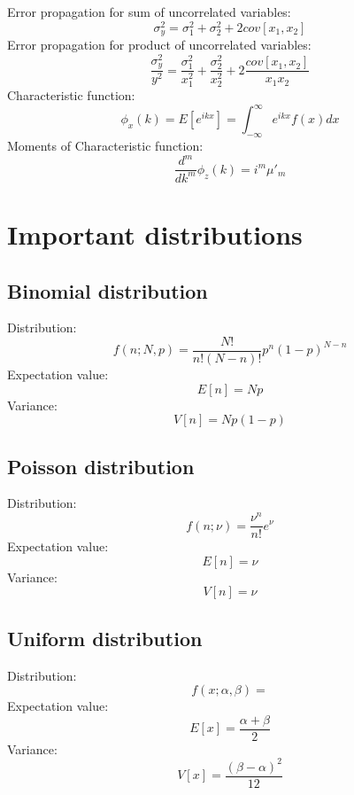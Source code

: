 \documentclass[12pt]{book}
\begin{document}
Error propagation for sum of uncorrelated variables:
\begin{equation}
	\sigma^2_y = \sigma^2_1 + \sigma^2_2 +2cov[x_1,x_2]
\end{equation}
Error propagation for product of uncorrelated variables:
\begin{equation}
	\frac{\sigma^2_y}{y^2} = \frac{\sigma^2_1}{x^2_1} + \frac{\sigma^2_2}{x^2_2} + 2\frac{cov[x_1,x_2]}{x_1x_2}
\end{equation}
Characteristic function:
\begin{equation}
	\phi_x(k) = E[e^{ikx}] = \int_{-\infty}^\infty e^{ikx}f(x)dx
\end{equation}
Moments of Characteristic function:
\begin{equation}
	\frac{d^m}{dk^m}\phi_z(k) = i^m \mu'_m
\end{equation}
\section{Important distributions}
\subsection{Binomial distribution}
Distribution:
\begin{equation}
	f(n;N,p) = \frac{N!}{n!(N-n)!}p^n(1-p)^{N-n}
\end{equation}
Expectation value:
\begin{equation}
	E[n] = Np
\end{equation}
Variance:
\begin{equation}
	V[n] = Np(1-p)
\end{equation}
\subsection{Poisson distribution}
Distribution:
\begin{equation}
	f(n;\nu) = \frac{\nu^n}{n!}e^{\nu}
\end{equation}
Expectation value:
\begin{equation}
	E[n] = \nu
\end{equation}
Variance:
\begin{equation}
	V[n] = \nu
\end{equation}
\subsection{Uniform distribution}
Distribution:
\begin{equation}
	f(x;\alpha,\beta) = 
\end{equation}
Expectation value:
\begin{equation}
	E[x] = \frac{\alpha + \beta}{2}
\end{equation}
Variance:
\begin{equation}
	V[x] = \frac{(\beta - \alpha)^2}{12}
\end{equation}
\end{document}
